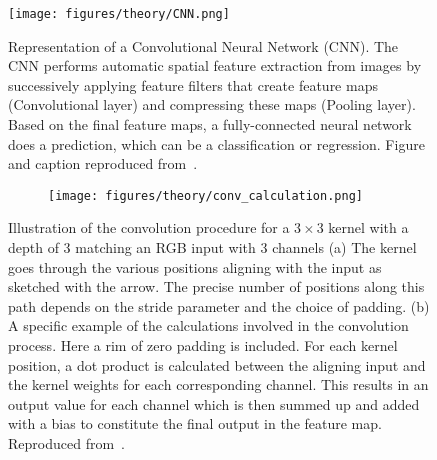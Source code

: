 \begin{figure}[!htb]
  \centering
  \texttt{[image: figures/theory/CNN.png]}
  \caption{Representation of a Convolutional Neural Network (\acrshort{CNN}). The \acrshort{CNN} performs automatic spatial feature extraction from images by successively applying feature filters that create feature maps (Convolutional layer) and compressing these maps (Pooling layer). Based on the final feature maps, a fully-connected neural network does a prediction, which can be a classification or regression. Figure and caption reproduced from~\cite{cunha2022review}.}  
  \label{fig:CNN}
\end{figure}


\begin{figure}[H]
  \centering
  \begin{subfigure}[t]{0.26\textwidth}
    \centering
    \raggedleft
    \caption{}
  \end{subfigure}
  \hfill
  \begin{subfigure}[t]{0.70\textwidth}
    \centering
    \texttt{[image: figures/theory/conv\_calculation.png]}
    \caption{}
    \label{fig:conv_calculation}
  \end{subfigure}
  \hfill
  \caption{Illustration of the convolution procedure for a $3 \times 3$ kernel with a depth of 3 matching an RGB input with 3 channels (a) The kernel goes through the various positions aligning with the input as sketched with the arrow. The precise number of positions along this path depends on the stride parameter and the choice of padding. (b) A specific example of the calculations involved in the convolution process. Here a rim of zero padding is included. For each kernel position, a dot product is calculated between the aligning input and the kernel weights for each corresponding channel. This results in an output value for each channel which is then summed up and added with a bias to constitute the final output in the feature map. Reproduced from~\cite{CNN_calc}.}
  \label{fig:conv_example}
\end{figure}



